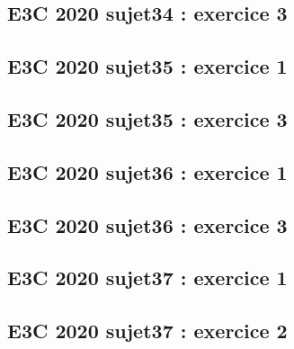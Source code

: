 \documentclass[lang=fr,edition=teacher,layout=sheet]{mxbook}
\begin{document}
\begingroup\endgroup
\par\bigskip
{}\subsection*{E3C 2020 sujet34 : exercice 3}
\begingroup\endgroup
\par\bigskip
{}\subsection*{E3C 2020 sujet35 : exercice 1}
\begingroup\endgroup
\par\bigskip
{}\subsection*{E3C 2020 sujet35 : exercice 3}
\begingroup\endgroup
\par\bigskip
{}\subsection*{E3C 2020 sujet36 : exercice 1}
\begingroup\endgroup
\par\bigskip
{}\subsection*{E3C 2020 sujet36 : exercice 3}
\begingroup\endgroup
\par\bigskip
{}\subsection*{E3C 2020 sujet37 : exercice 1}
\begingroup\endgroup
\par\bigskip
{}\subsection*{E3C 2020 sujet37 : exercice 2}
\end{document}
